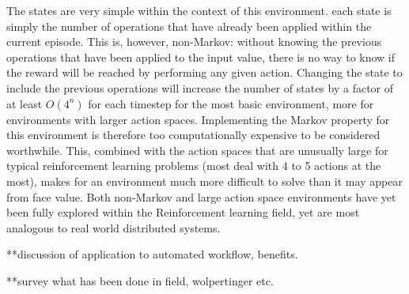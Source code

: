 The states are very simple within the context of this environment. each state is simply the number of operations that have already been applied within the current episode. This is, however, non-Markov: without knowing the previous operations that have been applied to the input value, there is no way to know if the reward will be reached by performing any given action. Changing the state to include the previous operations will increase the number of states by a factor of at least $O(4^n)$ for each timestep for the most basic environment, more for environments with larger action spaces. Implementing the Markov property for this environment is therefore too computationally expensive to be considered worthwhile. This, combined with the action spaces that are unusually large for typical reinforcement learning problems (most deal with 4 to 5 actions at the most), makes for an environment much more difficult to solve than it may appear from face value. Both non-Markov and large action space environments have yet been fully explored within the Reinforcement learning field, yet are most analogous to real world distributed systems. 


**discussion of application to automated workflow, benefits.

**survey what has been done in field, wolpertinger etc.



